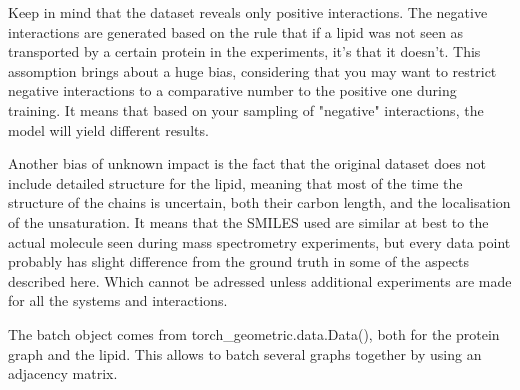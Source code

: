 \documentclass{pssbmac}
\begin{document}
Keep in mind that the dataset reveals only positive interactions. The negative interactions are generated based on the rule that if a lipid was not seen as transported by a certain protein in the experiments, it's that it doesn't. This assomption brings about a huge bias, considering that you may want to restrict negative interactions to a comparative number to the positive one during training. It means that based on your sampling of "negative" interactions, the model will yield different results.

Another bias of unknown impact is the fact that the original dataset does not include detailed structure for the lipid, meaning that most of the time the structure of the chains is uncertain, both their carbon length, and the localisation of the unsaturation. It means that the SMILES used are similar at best to the actual molecule seen during mass spectrometry experiments, but every data point probably has slight difference from the ground truth in some of the aspects described here. Which cannot be adressed unless additional experiments are made for all the systems and interactions.

The batch object comes from torch\_geometric.data.Data(), both for the protein graph and the lipid. This allows to batch several graphs together by using an adjacency matrix.
\printbibliography
\end{document}
